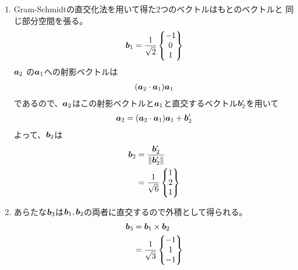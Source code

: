 \begin{ans*}
  ${}$
  \begin{enumerate}[label=(\arabic*)]
    \item Gram-Schmidtの直交化法を用いて得た2つのベクトルはもとのベクトルと
    同じ部分空間を張る。
    \begin{gather}
      {\bm{b}}_1 = \frac{1}{\sqrt{2}}
      \begin{Bmatrix}
      -1 \\ 0 \\ 1
      \end{Bmatrix}
    \end{gather}
    ${\bm{a}}_2$ の${\bm{a}}_1$への射影ベクトルは
    \begin{gather}
      ({\bm{a}}_2\cdot{\bm{a}}_1){\bm{a}}_1
    \end{gather}
    であるので、${\bm{a}}_2$はこの射影ベクトルと${\bm{a}}_1$と直交するベクトル${\bm{b}}'_2$を用いて
    \begin{gather}
      {\bm{a}}_2 = ({\bm{a}}_2\cdot{\bm{a}}_1){\bm{a}}_1 + {\bm{b}}'_2
    \end{gather}
    よって、${\bm{b}}_2$は
    \begin{align}
      {\bm{b}}_2
      &=
      \frac{{\bm{b}}'_2}{\|{\bm{b}}'_2\|} \\
      &=
      \frac{1}{\sqrt{6}}
      \begin{Bmatrix}
        1 \\ 2 \\ 1
      \end{Bmatrix}
    \end{align}
    \item あらたな${\bm{b}}_3$は${\bm{b}}_1,{\bm{b}}_2$の両者に直交するので外積として得られる。
    \begin{align}
      {\bm{b}}_3
      &=
      {\bm{b}}_1 \times {\bm{b}}_2 \\
      &=
      \frac{1}{\sqrt{3}}
      \begin{Bmatrix}
        -1 \\ 1 \\ -1
      \end{Bmatrix}
    \end{align}
  \end{enumerate}
\end{ans*}

